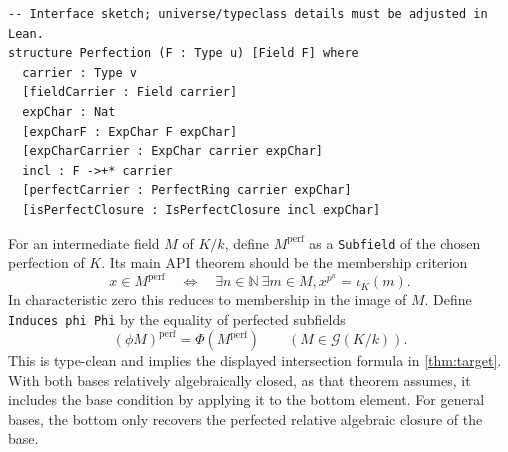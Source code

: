 \documentclass[11pt,oneside]{article}
\theoremstyle{definition}
\theoremstyle{remark}
\newcommand{\G}{\mathcal{G}}
\newcommand{\lean}[1]{\nolinkurl{#1}}
\begin{document}
\begin{lstlisting}
-- Interface sketch; universe/typeclass details must be adjusted in Lean.
structure Perfection (F : Type u) [Field F] where
  carrier : Type v
  [fieldCarrier : Field carrier]
  expChar : Nat
  [expCharF : ExpChar F expChar]
  [expCharCarrier : ExpChar carrier expChar]
  incl : F ->+* carrier
  [perfectCarrier : PerfectRing carrier expChar]
  [isPerfectClosure : IsPerfectClosure incl expChar]
\end{lstlisting}

For an intermediate field $M$ of $K/k$, define $M^{\mathrm{perf}}$ as a \lean{Subfield}
of the chosen perfection of $K$.  Its main API theorem should be the membership criterion
\[
 x\in M^{\mathrm{perf}}
 \quad\Longleftrightarrow\quad
 \exists n\in\mathbb N\ \exists m\in M,
 x^{p^n}=\iota_K(m).
\]
In characteristic zero this reduces to membership in the image of $M$.  Define
\lean{Induces phi Phi} by the equality of perfected subfields
\[
  (\phi M)^{\mathrm{perf}}=\Phi(M^{\mathrm{perf}})
  \qquad(M\in\G(K/k)).
\]
This is type-clean and implies the displayed intersection formula in
\cref{thm:target}.  With both bases relatively algebraically closed, as that theorem assumes,
it includes the base condition by applying it to the bottom element.  For general bases,
the bottom only recovers the perfected relative algebraic closure of the base.
\end{document}
